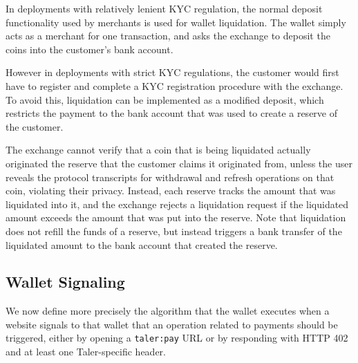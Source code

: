 In deployments with relatively lenient KYC regulation, the normal deposit
functionality used by merchants is used for wallet liquidation.  The wallet
simply acts as a merchant for one transaction, and asks the exchange to deposit
the coins into the customer's bank account.

However in deployments with strict KYC regulations, the customer would first
have to register and complete a KYC registration procedure with the exchange.
To avoid this, liquidation can be implemented as a modified deposit, which
restricts the payment to the bank account that was used to create a reserve of
the customer.

The exchange cannot verify that a coin that is being liquidated actually
originated the reserve that the customer claims it originated from, unless the
user reveals the protocol transcripts for withdrawal and refresh operations on
that coin, violating their privacy.  Instead, each reserve tracks the amount
that was liquidated into it, and the exchange rejects a liquidation request if
the liquidated amount exceeds the amount that was put into the reserve.  Note
that liquidation does not refill the funds of a reserve, but instead triggers a
bank transfer of the liquidated amount to the bank account that
created the reserve.


\subsection{Wallet Signaling}
We now define more precisely the algorithm that the wallet executes when a
website signals to that wallet that an operation related to payments should be
triggered, either by opening a \texttt{taler:pay} URL or by responding
with HTTP 402 and at least one Taler-specific header.

